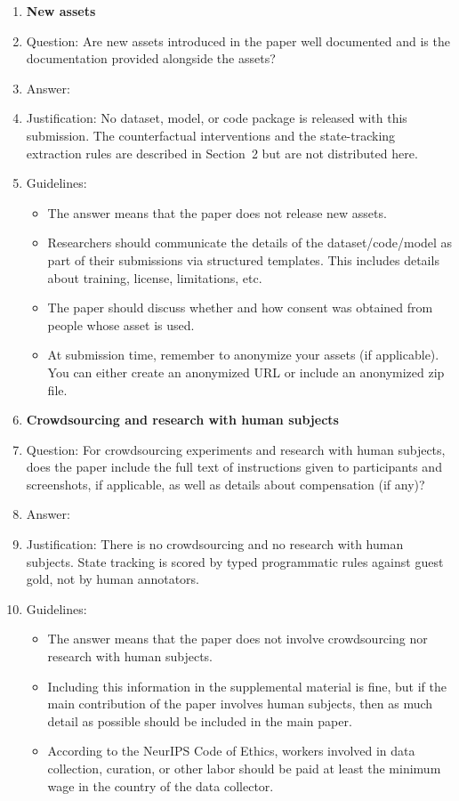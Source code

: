 \begin{enumerate}
\item {\bf New assets}
    \item[] Question: Are new assets introduced in the paper well documented and is the documentation provided alongside the assets?
    \item[] Answer: \answerNA{}
    \item[] Justification: No dataset, model, or code package is released with this submission. The counterfactual interventions and the state-tracking extraction rules are described in Section~2 but are not distributed here.
    \item[] Guidelines:
    \begin{itemize}
        \item The answer \answerNA{} means that the paper does not release new assets.
        \item Researchers should communicate the details of the dataset\slash code\slash model as part of their submissions via structured templates. This includes details about training, license, limitations, etc. 
        \item The paper should discuss whether and how consent was obtained from people whose asset is used.
        \item At submission time, remember to anonymize your assets (if applicable). You can either create an anonymized URL or include an anonymized zip file.
    \end{itemize}

\item {\bf Crowdsourcing and research with human subjects}
    \item[] Question: For crowdsourcing experiments and research with human subjects, does the paper include the full text of instructions given to participants and screenshots, if applicable, as well as details about compensation (if any)? 
    \item[] Answer: \answerNA{}
    \item[] Justification: There is no crowdsourcing and no research with human subjects. State tracking is scored by typed programmatic rules against guest gold, not by human annotators.
    \item[] Guidelines:
    \begin{itemize}
        \item The answer \answerNA{} means that the paper does not involve crowdsourcing nor research with human subjects.
        \item Including this information in the supplemental material is fine, but if the main contribution of the paper involves human subjects, then as much detail as possible should be included in the main paper. 
        \item According to the NeurIPS Code of Ethics, workers involved in data collection, curation, or other labor should be paid at least the minimum wage in the country of the data collector. 
    \end{itemize}


\end{enumerate}
